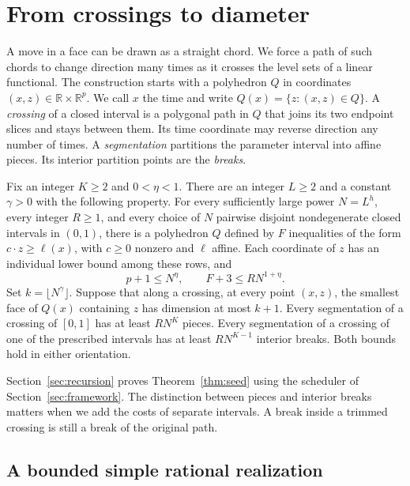 \section{From crossings to diameter}\label{sec:diameter}

A move in a face can be drawn as a straight chord. We force a path of
such chords to change direction many times as it crosses the level
sets of a linear functional. The construction starts with a polyhedron
\(Q\) in coordinates \((x,z)\in\mathbb R\times\mathbb R^p\). We call
\(x\) the time and write \(Q(x)=\{z:(x,z)\in Q\}\). A \emph{crossing}
of a closed interval is a polygonal path in \(Q\) that joins its two
endpoint slices and stays between them. Its time coordinate may reverse
direction any number of times. A \emph{segmentation} partitions the
parameter interval into affine pieces. Its interior partition points
are the \emph{breaks}.

\begin{theorem}\label{thm:seed}
Fix an integer \(K\ge2\) and \(0<\eta<1\). There are an integer
\(L\ge2\) and a constant \(\gamma>0\) with the following property. For
every sufficiently large power \(N=L^h\), every integer \(R\ge1\), and
every choice of \(N\) pairwise disjoint nondegenerate closed intervals in
\((0,1)\), there is a polyhedron \(Q\) defined by \(F\) inequalities of
the form \(c\cdot z\ge\ell(x)\), with \(c\ge0\) nonzero and \(\ell\)
affine. Each coordinate of \(z\) has an individual lower bound among
these rows, and
\[
                  p+1\le N^\eta,\qquad F+3\le R N^{1+\eta}.
\]
Set \(k=\lfloor N^\gamma\rfloor\). Suppose that along a crossing, at
every point \((x,z)\), the smallest face of \(Q(x)\) containing \(z\)
has dimension at most \(k+1\). Every segmentation of a crossing of
\([0,1]\) has at least \(RN^K\) pieces. Every segmentation of a
crossing of one of the prescribed intervals has at least \(RN^{K-1}\)
interior breaks. Both bounds hold in either orientation.
\end{theorem}

Section~\ref{sec:recursion} proves Theorem~\ref{thm:seed} using the
scheduler of Section~\ref{sec:framework}. The distinction between pieces
and interior breaks matters when we add the costs of separate intervals.
A break inside a trimmed crossing is still a break of the original path.

\subsection{A bounded simple rational realization}

